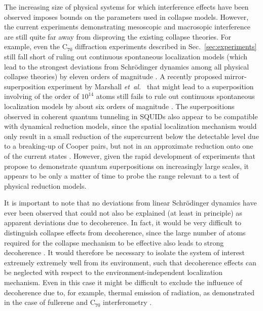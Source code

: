 \documentclass[12pt,aps,floatfix,amsmath,amssymb,showpacs,nofootinbib]{revtex4-2}
\newcommand{\etal}{\emph{et~al.\ }}
\begin{document}
The increasing size of physical systems for which interference effects
have been observed imposes bounds on the parameters used in collapse
models.  However, the current experiments demonstrating mesoscopic and
macrosopic interference are still quite far away from disproving the
existing collapse theories. For example, even the C$_{70}$
diffraction experiments described in Sec.~\ref{sec:experiments} still
fall short of ruling out continuous spontaneous localization models
\cite{Pearle:1989:cs,Diosi:1989:yb,Ghirardi:1990:lm} (which lead to
the strongest deviations from Schr\"odinger dynamics among all
physical collapse theories) by eleven orders of magnitude
\cite{Adler:2004:om}. A recently proposed mirror-superposition
experiment by Marshall \etal \cite{Marshall:2003:om} that might lead
to a superposition involving of the order of $10^{14}$ atoms still
fails to rule out continuous spontaneous localization models by about
six orders of magnitude \cite{Bassi:2005:om}. The superpositions
observed in coherent quantum tunneling in SQUIDs also appear to be
compatible with dynamical reduction models, since the spatial
localization mechanism would only result in a small reduction of the
supercurrent below the detectable level due to a breaking-up of Cooper
pairs, but not in an approximate reduction onto one of the current
states \cite{Rae:1990:wa,Buffa:1995:mo,Bassi:2003:yb}. However, given
the rapid development of experiments that propose to demonstrate
quantum superpositions on increasingly large scales, it appears to be
only a matter of time to probe the range relevant to a test of
physical reduction models.

It is important to note that no deviations from linear Schr\"odinger
dynamics have ever been observed that could not also be explained (at
least in principle) as apparent deviations due to decoherence. In
fact, it would be very difficult to distinguish collapse effects from
decoherence, since the large number of atoms required for the collapse
mechanism to be effective also leads to strong decoherence
\cite{Tegmark:1993:uz,Benatti:1995:re,Bassi:2003:yb}. It would
therefore be necessary to isolate the system of interest extremely
extremely well from its environment, such that decoherence effects can
be neglected with respect to the environment-independent localization
mechanism. Even in this case it might be difficult to exclude the
influence of decoherence due to, for example, thermal emission of
radiation, as demonstrated in the case of fullerene and C$_{70}$
interferometry \cite{Hackermuller:2004:rd,Hornberger:2005:mo}.
  
\end{document}

